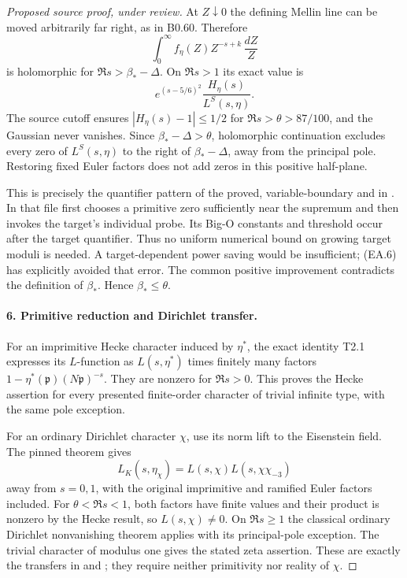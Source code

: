 \begin{proof}[Proposed source proof, under review]
At $Z\downarrow0$ the defining Mellin line can be moved arbitrarily far
right, as in B0.60. Therefore
\[
 \int_0^\infty f_\eta(Z)Z^{-s+k}\,\frac{dZ}{Z}
\]
is holomorphic for $\Re s>\beta_*-\Delta$. On $\Re s>1$ its exact
value is
\[
 e^{(s-5/6)^2}\frac{H_\eta(s)}{L^S(s,\eta)}.
\]
The source cutoff ensures $|H_\eta(s)-1|\le1/2$ for
$\Re s>\theta>87/100$, and the Gaussian never vanishes. Since
$\beta_*-\Delta>\theta$, holomorphic continuation excludes every zero
of $L^S(s,\eta)$ to the right of $\beta_*-\Delta$, away from the
principal pole. Restoring fixed Euler factors does not add zeros in
this positive half-plane.

This is precisely the quantifier pattern of the proved, variable-boundary
 and
 in
. In that file
 first chooses a primitive zero
sufficiently near the supremum and then invokes the target's individual
probe. Its Big-O constants and threshold occur after the target
quantifier. Thus no uniform numerical bound on growing target moduli is
needed. A target-dependent power saving would be insufficient; (EA.6)
has explicitly avoided that error. The common positive improvement
contradicts the definition of $\beta_*$. Hence $\beta_*\le\theta$.

\paragraph{6. Primitive reduction and Dirichlet transfer.}
For an imprimitive Hecke character induced by $\eta^*$, the exact
identity T2.1 expresses its $L$-function as $L(s,\eta^*)$ times finitely
many factors $1-\eta^*(\mathfrak p)(N\mathfrak p)^{-s}$.
They are nonzero for $\Re s>0$. This proves the Hecke assertion for
every presented finite-order character of trivial infinite type,
with the same pole exception.

For an ordinary Dirichlet character $\chi$, use its norm lift to the
Eisenstein field. The pinned theorem
 gives
\[
 L_K(s,\eta_\chi)=L(s,\chi)L(s,\chi\chi_{-3})
\]
away from $s=0,1$, with the original imprimitive and ramified Euler
factors included. For $\theta<\Re s<1$, both factors have finite
values and their product is nonzero by the Hecke result, so
$L(s,\chi)\ne0$. On $\Re s\ge1$ the classical ordinary Dirichlet
nonvanishing theorem applies with its principal-pole exception. The
trivial character of modulus one gives the stated zeta assertion.
These are exactly the transfers in
 and
; they require neither primitivity nor reality
of $\chi$.
\end{proof}

